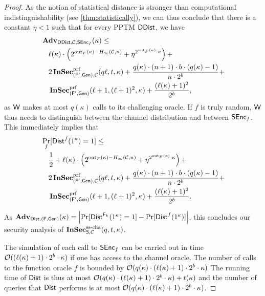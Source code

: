 \begin{proof}
  As the notion of  statistical distance is stronger than computational
  indistinguishability (see \autoref{thm:statistically}), we can thus
  conclude that there is a constant $\eta < 1$ such that for every
  \ac{PPTM} $\operatorname{\mathsf{DDist}}$, we have
  \begin{align*}
    &\operatorname{\mathbf{Adv}}_{\operatorname{\mathsf{DDist}},\mathcal{C},\operatorname{\mathsf{SEnc}}_{f}}(\kappa) \leq\\   
    &\quad\ell(\kappa)\cdot \left(2^{\operatorname{out}_{F}(\kappa)-H_{\infty}(\mathcal{C},n)}+\eta^{2^{\operatorname{out}_{F}(\kappa)}\cdot
  \kappa}\right)+\\
    &\quad 2\operatorname{\mathbf{InSec}}^{\operatorname{prf}}_{(\operatorname{\mathsf{F}}',\operatorname{\mathsf{Gen}}),\mathcal{C}}(q\ell,t,\kappa)+ \frac{q(\kappa)\cdot (n+1)\cdot b\cdot 
        (q(\kappa)-1)}{n\cdot 2^{b}}+\\
    &\quad     \operatorname{\mathbf{InSec}}^{\operatorname{prf}}_{(\operatorname{\mathsf{F}}',\operatorname{\mathsf{Gen}})}(\ell+1,(\ell+1)^{2},\kappa)+\frac{(\ell(\kappa)+1)^{2}}{2^{b}},
  \end{align*}
  as $\operatorname{\mathsf{W}}$ makes at most $q(\kappa)$ calls to its challenging
  oracle. If $f$ is truly random, $\operatorname{\mathsf{W}}$ thus needs to distinguish
  between the channel distribution and between $\operatorname{\mathsf{SEnc}}_{f}$. 
  This immediately implies that 
  \begin{align*}
    &\Pr_{f}[\operatorname{\mathsf{Dist}}^{f}(1^{\kappa})=1] \leq\\
    &\quad \frac{1}{2}+   \ell(\kappa)\cdot \left(2^{\operatorname{out}_{F}(\kappa)-H_{\infty}(\mathcal{C},n)}+\eta^{2^{\operatorname{out}_{F}(\kappa)}\cdot
  \kappa}\right)+\\
    &\quad 2\operatorname{\mathbf{InSec}}^{\operatorname{prf}}_{(\operatorname{\mathsf{F}}',\operatorname{\mathsf{Gen}}),\mathcal{C}}(q\ell,t,\kappa)+ \frac{q(\kappa)\cdot (n+1)\cdot b\cdot 
        (q(\kappa)-1)}{n\cdot 2^{b}}+\\
    &\quad     \operatorname{\mathbf{InSec}}^{\operatorname{prf}}_{(\operatorname{\mathsf{F}}',\operatorname{\mathsf{Gen}})}(\ell+1,(\ell+1)^{2},\kappa)+\frac{(\ell(\kappa)+1)^{2}}{2^{b}}.
  \end{align*}

  As $\operatorname{\mathbf{Adv}}_{\operatorname{\mathsf{Dist}},(\operatorname{\mathsf{F}},\operatorname{\mathsf{Gen}})}(\kappa)=\left| \Pr[\operatorname{\mathsf{Dist}}^{\operatorname{\mathsf{F}}_{k}}(1^{\kappa})=1] -
    \Pr[\operatorname{\mathsf{Dist}}^{f}(1^{\kappa})]\right|$, this concludes our security
  analysis of $\operatorname{\mathbf{InSec}}^{\operatorname{ss-cha}}_{\operatorname{\mathsf{S}},\mathcal{C}}(q,t,\kappa)$.

  The simulation of each call to $\operatorname{\mathsf{SEnc}}_{f}$ can be carried out in time
  $\mathcal{O}((\ell(\kappa)+1)\cdot 2^{b}\cdot \kappa)$ if one has access
  to the channel oracle.  The number of calls to the function oracle $f$
  is bounded by
  $\mathcal{O}(q(\kappa)\cdot (\ell(\kappa)+1)\cdot 2^{b}\cdot \kappa)$ The
  running time of $\operatorname{\mathsf{Dist}}$ is thus at most
  $\mathcal{O}(q(\kappa)\cdot (\ell(\kappa)+1)\cdot 2^{b}\cdot
  \kappa)+t(\kappa)$ and the number of queries that $\operatorname{\mathsf{Dist}}$ performs is
  at most
  $\mathcal{O}(q(\kappa)\cdot(\ell(\kappa)+1)\cdot 2^{b}\cdot \kappa)$.
  

\end{proof}
